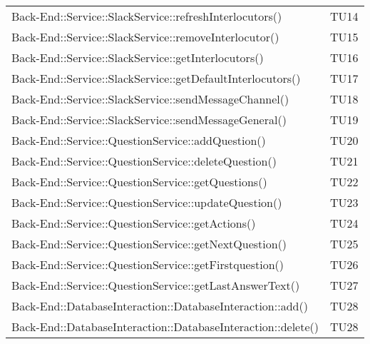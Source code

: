 \documentclass[../PianoDiQualifica.tex]{subfiles}
\begin{document}
\begin{longtable}[c] {>{\centering\arraybackslash}p{9cm} >{\centering\arraybackslash}p{3cm}}
 			\addlinespace[0.3em]
			\midrule
			\addlinespace[0.3em]
 			Back-End::Service::SlackService::refreshInterlocutors()& TU14 \\
 			\addlinespace[0.3em]
			\midrule
			\addlinespace[0.3em] 
			Back-End::Service::SlackService::removeInterlocutor()& TU15 \\
			\addlinespace[0.3em]
			\midrule
			\addlinespace[0.3em]
			Back-End::Service::SlackService::getInterlocutors()& TU16 \\ 
 			\addlinespace[0.3em]
			\midrule
			\addlinespace[0.3em]
			Back-End::Service::SlackService::getDefaultInterlocutors()& TU17 \\ 
 			\addlinespace[0.3em]
			\midrule
			\addlinespace[0.3em]
 			Back-End::Service::SlackService::sendMessageChannel()& TU18 \\ 
 			\addlinespace[0.3em]
			\midrule
			\addlinespace[0.3em]
 			Back-End::Service::SlackService::sendMessageGeneral()& TU19 \\ 
 			\addlinespace[0.3em]
			\midrule
			\addlinespace[0.3em]
			Back-End::Service::QuestionService::addQuestion()& TU20 \\
			\addlinespace[0.3em]
			\midrule
			\addlinespace[0.3em] 
 			Back-End::Service::QuestionService::deleteQuestion()& TU21 \\ 
 			\addlinespace[0.3em]
			\midrule
			\addlinespace[0.3em]
			Back-End::Service::QuestionService::getQuestions()& TU22 \\ 
 			\addlinespace[0.3em]
			\midrule
			\addlinespace[0.3em]
 			Back-End::Service::QuestionService::updateQuestion()& TU23 \\ 
 			\addlinespace[0.3em]
			\midrule
			\addlinespace[0.3em]
			Back-End::Service::QuestionService::getActions()& TU24 \\ 
 			\addlinespace[0.3em]
			\midrule
			\addlinespace[0.3em]
			Back-End::Service::QuestionService::getNextQuestion()& TU25 \\ 
 			\addlinespace[0.3em]
			\midrule
			\addlinespace[0.3em]
 			Back-End::Service::QuestionService::getFirstquestion()& TU26 \\ 
 			\addlinespace[0.3em]
			\midrule
			\addlinespace[0.3em]
 			Back-End::Service::QuestionService::getLastAnswerText()& TU27 \\ 
 			\addlinespace[0.3em]
			\midrule
			\addlinespace[0.3em]
 			Back-End::DatabaseInteraction::DatabaseInteraction::add()& TU28 \\ 
 			\addlinespace[0.3em]
			\midrule
			\addlinespace[0.3em]
 			Back-End::DatabaseInteraction::DatabaseInteraction::delete()& TU28 \\

\end{longtable}
\end{document}
